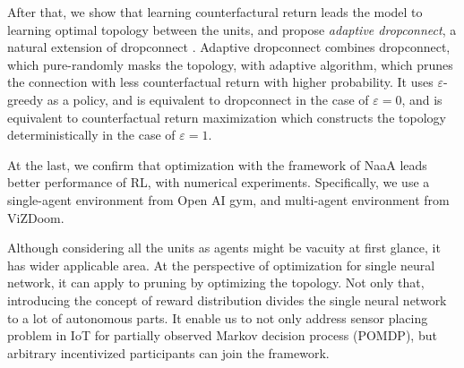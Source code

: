 After that, we show that learning counterfactural return leads the model to learning optimal topology between the units,
and propose {\em adaptive dropconnect}, a natural extension of dropconnect \citep{wan2013regularization}.
Adaptive dropconnect combines dropconnect, which pure-randomly masks the topology, with adaptive algorithm, which prunes the connection with less counterfactual return with higher probability.
It uses $\varepsilon$-greedy as a policy, and is equivalent to dropconnect in the case of $\varepsilon = 0$, and is equivalent to counterfactual return maximization which constructs the topology deterministically in the case of $\varepsilon = 1$.

At the last, we confirm that optimization with the framework of NaaA leads better performance of RL, with numerical experiments.
Specifically, we use a single-agent environment from Open AI gym, and multi-agent environment from ViZDoom.

Although considering all the units as agents might be vacuity at first glance, it has wider applicable area.
At the perspective of optimization for single neural network, it can apply to pruning by optimizing the topology.
Not only that, introducing the concept of reward distribution divides the single neural network to a lot of autonomous parts.
It enable us to not only address sensor placing problem in IoT for partially observed Markov decision process (POMDP), but arbitrary incentivized participants can join the framework. 
